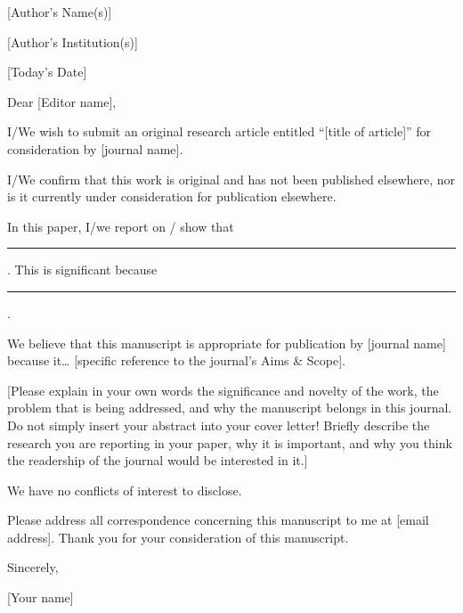 \documentclass{letter}
\begin{document}
[Author's Name(s)]

[Author's Institution(s)]

\vspace{1pc}


[Today's Date]\\

\vspace{1pc}



Dear [Editor name], 

\vspace{6pt}
I/We wish to submit an original research article entitled “[title of article]” for consideration by [journal name]. 

\vspace{6pt}

I/We confirm that this work is original and has not been published elsewhere, nor is it currently under consideration for publication elsewhere.

\vspace{6pt}

In this paper, I/we report on / show that \rule{4cm}{0.5pt}. This is significant because \rule{4cm}{0.5pt}.  

\vspace{6pt}

We believe that this manuscript is appropriate for publication by [journal name] because it… [specific reference to the journal’s Aims \& Scope]. 
\vspace{6pt}

[Please explain in your own words the significance and novelty of the work, the problem that is being addressed, and why the manuscript belongs in this journal. Do not simply insert your abstract into your cover letter! Briefly describe the research you are reporting in your paper, why it is important, and why you think the readership of the journal would be interested in it.]

\vspace{6pt}

We have no conflicts of interest to disclose. 

\vspace{6pt}

Please address all correspondence concerning this manuscript to me at [email address].
Thank you for your consideration of this manuscript. 

\vspace{6pt}

Sincerely,

\vspace{6pt}

[Your name]
\end{document}
